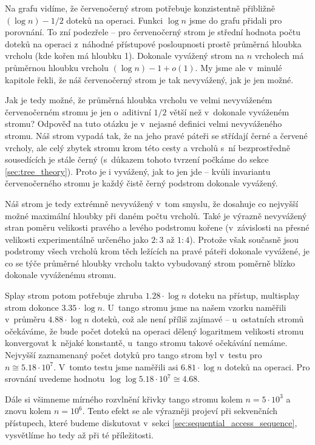 Na grafu vidíme, že červenočerný strom potřebuje konzistentně přibližně $(\log
n) - 1/2$ doteků na operaci. Funkci $\log n$ jsme do grafu přidali pro porovnání. To zní podezřele --
pro červenočerný strom je střední hodnota počtu doteků na operaci z~náhodné
přístupové posloupnosti prostě průměrná hloubka vrcholu (kde kořen má hloubku
1). Dokonale vyvážený strom na $n$ vrcholech má průměrnou hloubku
vrcholu $(\log n) - 1 + o(1)$. My jsme ale v~minulé kapitole řekli, že náš
červenočerný strom je tak nevyvážený, jak je jen možné.

Jak je tedy možné, že průměrná hloubka vrcholu ve velmi nevyváženém
červenočerném stromu je jen o~aditivní $1/2$ větší než v~dokonale vyváženém
stromu? Odpověď na tuto otázku je v~nejasné definici velmi nevyváženého stromu.
Náš strom vypadá tak, že na jeho pravé páteři se střídají černé a červené
vrcholy, ale celý zbytek stromu krom této cesty a vrcholů s~ní bezprostředně
sousedících je stále černý (s~důkazem tohoto tvrzení počkáme do sekce \ref{sec:tree_theory}). Proto je i vyvážený, jak to jen jde -- kvůli
invariantu červenočerného stromu je každý čistě černý podstrom dokonale
vyvážený.

Náš strom je
tedy extrémně nevyvážený v~tom smyslu, že dosahuje co nejvyšší možné maximální
hloubky při daném počtu vrcholů. Také je výrazně nevyvážený stran poměru
velikosti pravého a levého podstromu kořene (v~závislosti na přesné velikosti
experimentálně určeného jako $2:3$ až $1:4$). Protože však současně jsou
podstromy všech vrcholů krom těch ležících na pravé páteři dokonale
vyvážené, je co se týče průměrné hloubky vrcholu takto vybudovaný strom poměrně
blízko dokonale vyváženému stromu.


Splay strom potom potřebuje zhruba $1.28\cdot \log n$ doteku na přístup, multisplay strom
dokonce $3.35\cdot \log n$. U~tango stromu jsme na našem vzorku naměřili
v~průměru $4.88\cdot \log n$ doteků, což ale není příliš zajímavé -- u~ostatních
stromů očekáváme, že bude počet doteků na operaci dělený logaritmem velikosti stromu konvergovat
k~nějaké konstantě, u~tango stromu takové očekávání nemáme. Nejvyšší zaznamenaný
počet dotyků pro tango strom byl v~testu pro $n \cong 5.18\cdot 10^7$. V~tomto
testu jsme naměřili asi $6.81\cdot \log n$ doteků na operaci. Pro srovnání uvedeme hodnotu
$\log\log 5.18\cdot 10^7 \cong 4.68$. 

Dále si všimneme mírného rozvlnění křivky tango stromu kolem $n=5\cdot 10^3$ a
znovu kolem $n= 10^6$. Tento efekt se ale výrazněji projeví při
sekvenčních přístupech, které budeme diskutovat v~sekci \ref{sec:sequential_access_sequence}, vysvětlíme ho tedy až při té příležitosti.

